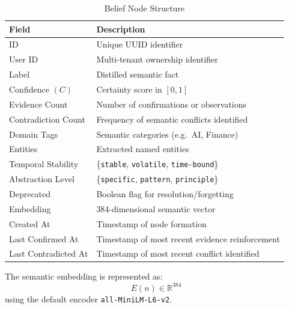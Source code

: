 \documentclass[11pt,a4paper]{article}
\newcommand{\R}{\mathbb{R}}
\begin{document}
\begin{table}[h!]
\centering
\caption{Belief Node Structure}
\begin{tabular}{@{} p{4.2cm} p{8.8cm} @{}}
    \toprule
    \textbf{Field}         & \textbf{Description}                              \\
    \midrule
    ID                     & Unique UUID identifier                            \\
    User ID                & Multi-tenant ownership identifier                 \\
    Label                  & Distilled semantic fact                           \\
    Confidence $(C)$       & Certainty score in $[0,1]$                        \\
    Evidence Count         & Number of confirmations or observations           \\
    Contradiction Count    & Frequency of semantic conflicts identified        \\
    Domain Tags            & Semantic categories (e.g.\ AI, Finance)           \\
    Entities               & Extracted named entities                          \\
    Temporal Stability     & \{\texttt{stable}, \texttt{volatile},
                             \texttt{time-bound}\}                              \\
    Abstraction Level      & \{\texttt{specific}, \texttt{pattern},
                             \texttt{principle}\}                               \\
    Deprecated             & Boolean flag for resolution/forgetting            \\
    Embedding              & 384-dimensional semantic vector                   \\
    Created At             & Timestamp of node formation                       \\
    Last Confirmed At      & Timestamp of most recent evidence reinforcement   \\
    Last Contradicted At   & Timestamp of most recent conflict identified      \\
    \bottomrule
\end{tabular}
\end{table}

The semantic embedding is represented as:
\[
    E(n) \in \R^{384}
\]
using the default encoder \texttt{all-MiniLM-L6-v2}.
\end{document}
